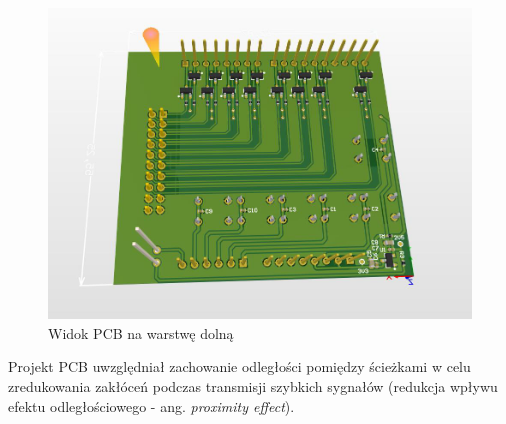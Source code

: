 \begin{figure}[H]
\begin{center}
\includegraphics[width=4 in]{images/3D_2.png}
\end{center}
\caption{Widok PCB na warstwę dolną}
\label{fig:PCB_bottom}
\end{figure}

Projekt PCB uwzględniał zachowanie odległości pomiędzy ścieżkami w celu zredukowania zakłóceń podczas transmisji szybkich sygnałów (redukcja wpływu efektu odległościowego - ang. \textit{proximity effect}).